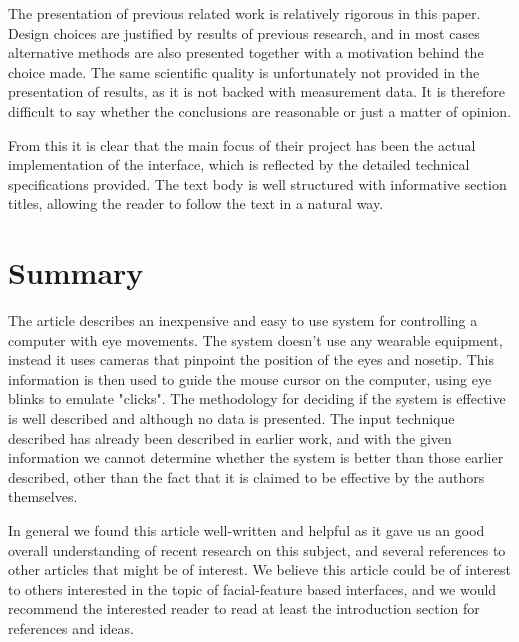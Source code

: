 \documentclass[a4paper,10pt]{article}
\begin{document}
The presentation of previous related work is relatively rigorous in this paper. Design choices are justified by results of previous research, and in most cases alternative methods are also presented together with a motivation behind the choice made. The same scientific quality is unfortunately not provided in the presentation of results, as it is not backed with measurement data. It is therefore difficult to say whether the conclusions are reasonable or just a matter of opinion.


From this it is clear that the main focus of their project has been the actual implementation of the interface, which is reflected by the detailed technical specifications provided. The text body is well structured with informative section titles, allowing the reader to follow the text in a natural way.


\section{Summary}
The article describes an inexpensive and easy to use system for controlling a computer with eye movements. The system doesn't use any wearable equipment, instead it uses cameras that pinpoint the position of the eyes and nosetip. This information is then used to guide the mouse cursor on the computer, using eye blinks to emulate "clicks". The methodology for deciding if the system is effective is well described and although no data is presented. The input technique described has already been described in earlier work, and with the given information we cannot determine whether the system is better than those earlier described, other than the fact that it is claimed to be effective by the authors themselves.

In general we found this article well-written and helpful as it gave us an good overall understanding of recent research on this subject, and several references to other articles that might be of interest. We believe this article could be of interest to others interested in the topic of facial-feature based interfaces, and we would recommend the interested reader to read at least the introduction section for references and ideas.
\end{document}
